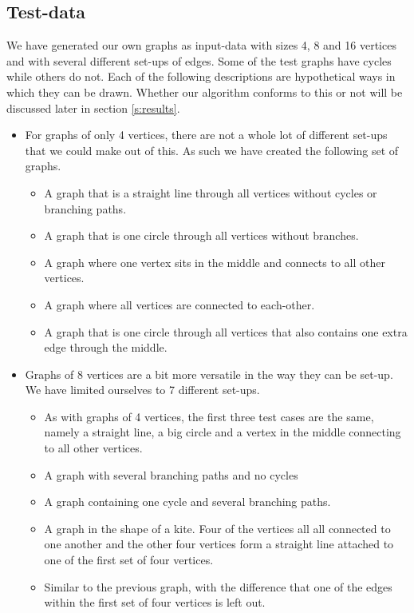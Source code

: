 \documentclass[a4paper,12pt,twoside]{article}
\begin{document}
\subsection{Test-data}
We have generated our own graphs as input-data with sizes 4, 8 and 16 vertices and with several different set-ups of edges. Some of the test graphs have cycles while others do not. Each of the following descriptions are hypothetical ways in which they can be drawn. Whether our algorithm conforms to this or not will be discussed later in section \ref{s:results}.
\begin{itemize}
\item For graphs of only 4 vertices, there are not a whole lot of different set-ups that we could make out of this. As such we have created the following set of graphs.
\begin{itemize}
\item A graph that is a straight line through all vertices without cycles or branching paths.
\item A graph that is one circle through all vertices without branches.
\item A graph where one vertex sits in the middle and connects to all other vertices.
\item A graph where all vertices are connected to each-other.
\item A graph that is one circle through all vertices that also contains one extra edge through the middle.
\end{itemize}
\item Graphs of 8 vertices are a bit more versatile in the way they can be set-up. We have limited ourselves to 7 different set-ups.
\begin{itemize}
\item As with graphs of 4 vertices, the first three test cases are the same, namely a straight line, a big circle and a vertex in the middle connecting to all other vertices.
\item A graph with several branching paths and no cycles
\item A graph containing one cycle and several branching paths.
\item A graph in the shape of a kite. Four of the vertices all all connected to one another and the other four vertices form a straight line attached to one of the first set of four vertices.
\item Similar to the previous graph, with the difference that one of the edges within the first set of four vertices is left out.
\end{itemize}

\end{itemize}
\end{document}
